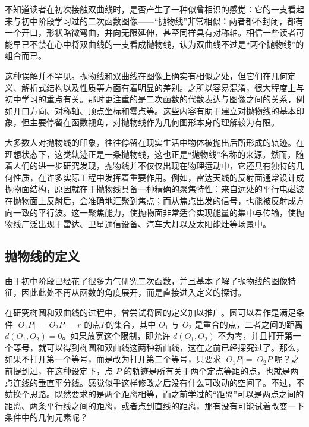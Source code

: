 
\begin{issues}
\issueDraft
\end{issues}


不知道读者在初次接触双曲线时，是否产生了一种似曾相识的感觉：它的一支看起来与初中阶段学习过的二次函数图像——“抛物线”非常相似：两者都不封闭，都有一个开口，形状略微弯曲，并向无限延伸，甚至同样具有对称轴。相信一些读者可能早已不禁在心中将双曲线的一支看成抛物线，认为双曲线不过是“两个抛物线”的组合而已。

这种误解并不罕见。抛物线和双曲线在图像上确实有相似之处，但它们在几何定义、解析式结构以及性质等方面有着明显的差别。之所以容易混淆，很大程度上与初中学习的重点有关。那时更注重的是二次函数的代数表达与图像之间的关系，例如开口方向、对称轴、顶点坐标和零点等。这些内容有助于建立对抛物线的基本印象，但主要停留在函数视角，对抛物线作为几何图形本身的理解较为有限。

大多数人对抛物线的印象，往往停留在现实生活中物体被抛出后所形成的轨迹。在理想状态下，这类轨迹正是一条抛物线，这也正是“抛物线”名称的来源。然而，随着人们的进一步研究发现，抛物线并不仅仅出现在物理运动中，它还具有独特的几何性质，在许多实际工程中发挥着重要作用。例如，雷达天线的反射面通常设计成抛物面结构，原因就在于抛物线具备一种精确的聚焦特性：来自远处的平行电磁波在抛物面上反射后，会准确地汇聚到焦点；而从焦点出发的信号，也能被反射成方向一致的平行波。这一聚焦能力，使抛物面非常适合实现能量的集中与传输，使抛物线广泛出现于雷达、卫星通信设备、汽车大灯以及太阳能灶等场景中。

\subsection{抛物线的定义}

由于初中阶段已经花了很多力气研究二次函数，并且基本了解了抛物线的图像特征，因此此处不再从函数的角度展开，而是直接进入定义的探讨。

在研究椭圆和双曲线的过程中，曾尝试将圆的定义加以推广。圆可以看作是满足条件 $|O_1P| = |O_2P| = r$ 的点$P$的集合，其中 $O_1$ 与 $O_2$ 是重合的点，二者之间的距离 $d(O_1,O_2)=0$。如果放宽这个限制，即允许 $d(O_1,O_2)$ 不为零，并且打开第一个等号，就可以得到椭圆和双曲线这两种新曲线，这在之前已经探究过了。那么，如果不打开第一个等号，而是改为打开第二个等号，只要求 $|O_1P| = |O_2P|$呢？之前提到过，在这种设定下，点 $P$ 的轨迹是所有关于两个定点等距的点，也就是两点连线的垂直平分线。感觉似乎这样修改之后没有什么可改动的空间了。不过，不妨换个思路。既然要求的是两个距离相等，而之前学过的“距离”可以是两点之间的距离、两条平行线之间的距离，或者点到直线的距离，那有没有可能试着改变一下条件中的几何元素呢？

